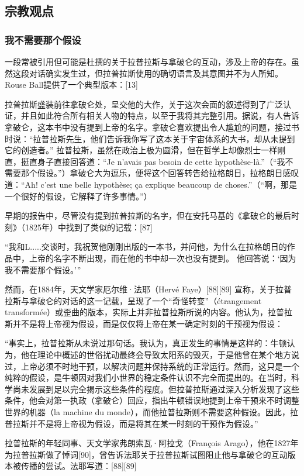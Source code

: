 \subsection{宗教观点}  
\subsubsection{我不需要那个假设}  
一段常被引用但可能是杜撰的关于拉普拉斯与拿破仑的互动，涉及上帝的存在。虽然这段对话确实发生过，但拉普拉斯使用的确切语言及其意图并不为人所知。Rouse Ball提供了一个典型版本：[13]  

拉普拉斯盛装前往拿破仑处，呈交他的大作，关于这次会面的叙述得到了广泛认证，并且如此符合所有相关人物的特点，以至于我将其完整引用。据说，有人告诉拿破仑，这本书中没有提到上帝的名字。拿破仑喜欢提出令人尴尬的问题，接过书时说：“拉普拉斯先生，他们告诉我你写了这本关于宇宙体系的大书，却从未提到它的创造者。” 拉普拉斯，虽然在政治上极为圆滑，但在哲学上却像烈士一样刚直，挺直身子直接回答道：“Je n'avais pas besoin de cette hypothèse-là.”（“我不需要那个假设。”）拿破仑大为逗乐，便将这个回答转告给拉格朗日，拉格朗日感叹道：“Ah! c'est une belle hypothèse; ça explique beaucoup de choses.”（“啊，那是一个很好的假设，它解释了许多事情。”）

早期的报告中，尽管没有提到拉普拉斯的名字，但在安托马基的《拿破仑的最后时刻》（1825年）中找到了类似的记载：[87]

“我和L.....交谈时，我祝贺他刚刚出版的一本书，并问他，为什么在拉格朗日的作品中，上帝的名字不断出现，而在他的书中却一次也没有提到。 他回答说：‘因为我不需要那个假设。’”

然而，在1884年，天文学家厄尔维·法耶（Hervé Faye）[88][89] 宣称，关于拉普拉斯与拿破仑的对话的这一记载，呈现了一个“奇怪转变”（étrangement transformée）或歪曲的版本，实际上并非拉普拉斯所说的内容。他认为，拉普拉斯并不是将上帝视为假设，而是仅仅将上帝在某一确定时刻的干预视为假设：

“事实上，拉普拉斯从未说过那句话。我认为，真正发生的事情是这样的：牛顿认为，他在理论中概述的世俗扰动最终会导致太阳系的毁灭，于是他曾在某个地方说过，上帝必须不时地干预，以解决问题并保持系统的正常运行。然而，这只是一个纯粹的假设，是牛顿因对我们小世界的稳定条件认识不完全而提出的。在当时，科学尚未发展到足以完全揭示这些条件的程度。但拉普拉斯通过深入分析发现了这些条件，他会对第一执政（拿破仑）回应，指出牛顿错误地提到上帝干预来不时调整世界的机器（la machine du monde），而他拉普拉斯则不需要这种假设。因此，拉普拉斯并不是将上帝视为假设，而是将其在某一时刻的干预作为假设。”

拉普拉斯的年轻同事、天文学家弗朗索瓦·阿拉戈（François Arago），他在1827年为拉普拉斯做了悼词[90]，曾告诉法耶关于拉普拉斯试图阻止他与拿破仑的互动版本被传播的尝试。法耶写道：[88][89]

